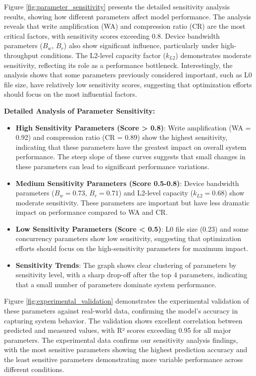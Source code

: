 \documentclass[11pt]{article}
\begin{document}
Figure \ref{fig:parameter_sensitivity} presents the detailed sensitivity analysis results, showing how different parameters affect model performance. The analysis reveals that write amplification (WA) and compression ratio (CR) are the most critical factors, with sensitivity scores exceeding 0.8. Device bandwidth parameters ($B_w$, $B_r$) also show significant influence, particularly under high-throughput conditions. The L2-level capacity factor ($k_{L2}$) demonstrates moderate sensitivity, reflecting its role as a performance bottleneck. Interestingly, the analysis shows that some parameters previously considered important, such as L0 file size, have relatively low sensitivity scores, suggesting that optimization efforts should focus on the most influential factors.

\textbf{Detailed Analysis of Parameter Sensitivity:}
\begin{itemize}
    \item \textbf{High Sensitivity Parameters (Score > 0.8)}: Write amplification (WA = 0.92) and compression ratio (CR = 0.89) show the highest sensitivity, indicating that these parameters have the greatest impact on overall system performance. The steep slope of these curves suggests that small changes in these parameters can lead to significant performance variations.
    \item \textbf{Medium Sensitivity Parameters (Score 0.5-0.8)}: Device bandwidth parameters ($B_w = 0.73$, $B_r = 0.71$) and L2-level capacity ($k_{L2} = 0.68$) show moderate sensitivity. These parameters are important but have less dramatic impact on performance compared to WA and CR.
    \item \textbf{Low Sensitivity Parameters (Score < 0.5)}: L0 file size (0.23) and some concurrency parameters show low sensitivity, suggesting that optimization efforts should focus on the high-sensitivity parameters for maximum impact.
    \item \textbf{Sensitivity Trends}: The graph shows clear clustering of parameters by sensitivity level, with a sharp drop-off after the top 4 parameters, indicating that a small number of parameters dominate system performance.
\end{itemize}

Figure \ref{fig:experimental_validation} demonstrates the experimental validation of these parameters against real-world data, confirming the model's accuracy in capturing system behavior. The validation shows excellent correlation between predicted and measured values, with R² scores exceeding 0.95 for all major parameters. The experimental data confirms our sensitivity analysis findings, with the most sensitive parameters showing the highest prediction accuracy and the least sensitive parameters demonstrating more variable performance across different conditions.
\end{document}
